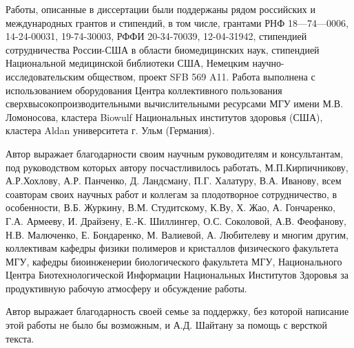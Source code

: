 
Работы, описанные в диссертации были поддержаны рядом российских и международных грантов и стипендий, в том числе, грантами РНФ 18—74—0006, 14-24-00031, 19-74-30003, РФФИ 20-34-70039, 12-04-31942, стипендией сотрудничества России-США в области биомедицинских наук, стипендией Национальной медицинской библиотеки США, Немецким научно-исследовательским обществом, проект SFB 569 A11. Работа выполнена с использованием оборудования Центра коллективного пользования сверхвысокопроизводительными вычислительными ресурсами МГУ имени М.В. Ломоносова, кластера Biowulf Национальных институтов здоровья (США), кластера Aldan университета г. Ульм (Германия).

Автор выражает благодарности своим научным руководителям и консультантам, под руководством которых автору посчастливилось работать, М.П.Кирпичникову, А.Р.Хохлову, А.Р. Панченко, Д. Ландсману, П.Г. Халатуру, В.А. Иванову, всем соавторам своих научных работ и коллегам за плодотворное сотрудничество, в особенности, В.Б. Журкину, В.М. Студитскому, К.Ву, Х. Жао, А. Гончаренко, Г.А. Армееву, И. Драйзену, Е.-К. Шиллингер, О.С. Соколовой, А.В. Феофанову, Н.В. Малюченко, Е. Бондаренко, М. Валиевой, А. Любителеву и многим другим, коллективам кафедры физики полимеров и кристаллов физического факультета МГУ, кафедры биоинженерии биологического факультета МГУ, Национального Центра Биотехнологической Информации Национальных Институтов Здоровья за продуктивную рабочую атмосферу и обсуждение работы.

Автор выражает благодарность своей семье за поддержку, без которой написание этой работы не было бы возможным, и А.Д. Шайтану за помощь с версткой текста.
